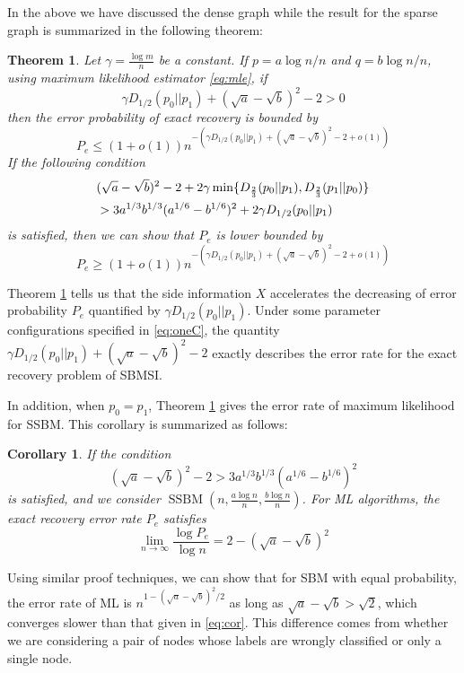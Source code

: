 \documentclass[conference]{IEEEtran}
\newtheorem{theorem}{Theorem}
\newtheorem{corollary}{Corollary}
\DeclareMathOperator{\SSBM}{SSBM}
\begin{document}
In the above we have discussed the dense graph while the result for the sparse graph
is summarized
in the following theorem:
\begin{theorem}\label{thm:Pe}
Let $\gamma = \frac{\log m}{n}$ be a constant. If $p = a \log n /n$ and $q = b \log n / n$, using maximum likelihood estimator \eqref{eq:mle},
if
\begin{equation}\label{eq:positive_condition}
\gamma D_{1/2}(p_0||p_1) + (\sqrt{a} - \sqrt{b})^2-2 > 0
\end{equation}
then the error probability
of exact recovery is bounded by
\begin{equation}\label{eq:PeMain}
P_e \leq (1+o(1)) n^{-\left(\gamma D_{1/2}(p_0||p_1) + (\sqrt{a} - \sqrt{b})^2-2 + o(1)\right) }
\end{equation}
If the following condition
\begin{align}
&(\sqrt{a}-\sqrt{b})^2-2 + 2\gamma \min \{D_{\frac{2}{3}}(p_0||p_1), D_{\frac{2}{3}}(p_1||p_0) \} \notag \\
&> 3a^{1/3}b^{1/3}(a^{1/6}-b^{1/6})^2 + 2\gamma D_{1/2}(p_0||p_1)\label{eq:oneC}
\end{align}
is satisfied, then we can show that $P_e$ is lower bounded by
\begin{equation}\label{eq:PeMainL}
P_e \geq (1+o(1)) n^{-\left(\gamma D_{1/2}(p_0||p_1) + (\sqrt{a} - \sqrt{b})^2-2 + o(1)\right)}
\end{equation}
\end{theorem}
Theorem \ref{thm:Pe} tells us that the side information $X$ accelerates the
decreasing of error probability $P_e$ quantified by $\gamma D_{1/2}(p_0||p_1)$.
Under some parameter configurations specified in \eqref{eq:oneC},
the quantity $\gamma D_{1/2}(p_0||p_1) + (\sqrt{a} - \sqrt{b})^2-2$
exactly describes the error rate for the exact recovery problem of SBMSI.

In addition, when $p_0=p_1$,
Theorem \ref{thm:Pe} gives the error rate of maximum likelihood for SSBM. This corollary is
summarized as follows:
\begin{corollary}
If the condition
\begin{equation}
(\sqrt{a}-\sqrt{b})^2-2 > 3a^{1/3}b^{1/3}(a^{1/6}-b^{1/6})^2
\end{equation}
is satisfied,
 and we consider $\SSBM(n,\frac{a\log n}{n}, \frac{b \log n}{n})$. For ML algorithms, the exact recovery error rate $P_e$ satisfies
\begin{equation}\label{eq:cor}
\lim_{n\to \infty} \frac{\log P_e}{\log n} =2-(\sqrt{a} - \sqrt{b})^2
\end{equation}
\end{corollary}
Using similar proof techniques, we can show that for SBM with equal probability, the error rate of ML is $n^{1-(\sqrt{a} - \sqrt{b})^2/2}$
as long as $\sqrt{a} -\sqrt{b} > \sqrt{2}$,
which converges slower than that given in \eqref{eq:cor}. This difference comes from whether we are considering a pair of nodes whose labels are wrongly
classified or only a single node.
\end{document}
